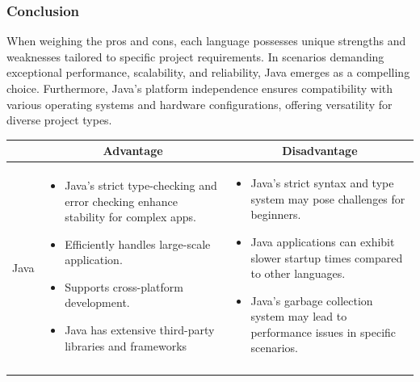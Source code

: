 \subsubsection{Conclusion}

When weighing the pros and cons, each language possesses unique strengths and weaknesses tailored to specific project requirements. In scenarios demanding exceptional performance, scalability, and reliability, Java emerges as a compelling choice. Furthermore, Java's platform independence ensures compatibility with various operating systems and hardware configurations, offering versatility for diverse project types.

\begin{table}[H]
    \centering
    \begin{tabular}{| c | p{} | p{} |}
        \hline
        \multicolumn{1}{|c|}{} & \multicolumn{1}{c|}{Advantage} & \multicolumn{1}{c|}{Disadvantage} \\ \hline
        \multirow{8}{*}{Java}     
                &   \begin{itemize}[leftmargin=*,topsep=0pt,partopsep=0pt,parsep=0pt]
                        \item Java's strict type-checking and error checking enhance stability for complex apps.
                        \item Efficiently handles large-scale application.
                        \item Supports cross-platform development.
                        \item Java has extensive third-party libraries and frameworks
                    \end{itemize}
                &   \begin{itemize}[leftmargin=*,topsep=0pt,partopsep=0pt,parsep=0pt]
                        \item Java's strict syntax and type system may pose challenges for beginners.
                        \item Java applications can exhibit slower startup times compared to other languages.
                        \item Java's garbage collection system may lead to performance issues in specific scenarios.
                    \end{itemize} \\ \hline
        \multirow{8}{*}{Python}
                &   \begin{itemize}[leftmargin=*,topsep=0pt,partopsep=0pt,parsep=0pt]

\end{itemize}
\end{tabular}
\end{table}
